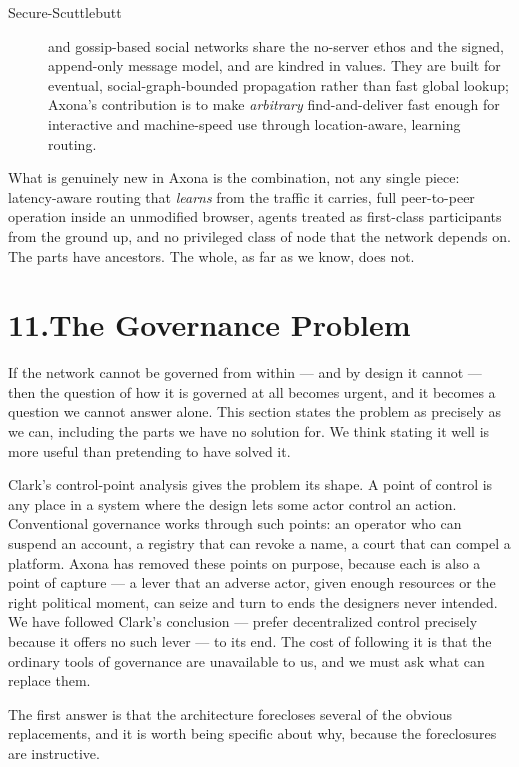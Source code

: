 \documentclass[nobib,justified]{tufte-handout}
\begin{document}
\begin{description}
\item[Secure-Scuttlebutt] and gossip-based social networks share the no-server
ethos and the signed, append-only message model, and are kindred in values. They
are built for eventual, social-graph-bounded propagation rather than fast global
lookup; Axona's contribution is to make \emph{arbitrary} find-and-deliver fast
enough for interactive and machine-speed use through location-aware, learning
routing.
\end{description}

What is genuinely new in Axona is the combination, not any single piece:
latency-aware routing that \emph{learns} from the traffic it carries, full
peer-to-peer operation inside an unmodified browser, agents treated as
first-class participants from the ground up, and no privileged class of node that
the network depends on. The parts have ancestors. The whole, as far as we know,
does not.

\section{11.\quad The Governance Problem}

If the network cannot be governed from within --- and by design it cannot ---
then the question of how it is governed at all becomes urgent, and it becomes a
question we cannot answer alone. This section states the problem as precisely as
we can, including the parts we have no solution for. We think stating it well is
more useful than pretending to have solved it.

Clark's control-point analysis gives the problem its shape. A point of control is
any place in a system where the design lets some actor control an action.
Conventional governance works through such points: an operator who can suspend an
account, a registry that can revoke a name, a court that can compel a platform.
Axona has removed these points on purpose, because each is also a point of
capture --- a lever that an adverse actor, given enough resources or the right
political moment, can seize and turn to ends the designers never intended. We have
followed Clark's conclusion --- prefer decentralized control precisely because it
offers no such lever --- to its end. The cost of following it is that the ordinary
tools of governance are unavailable to us, and we must ask what can replace them.

The first answer is that the architecture forecloses several of the
obvious replacements, and it is worth being specific about why, because the
foreclosures are instructive.
\end{document}
